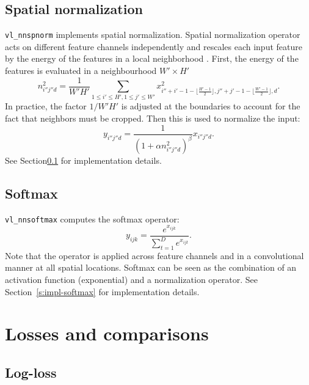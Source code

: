 \subsection{Spatial normalization}\label{s:spnorm}

\verb!vl_nnspnorm! implements spatial normalization. Spatial normalization operator acts on different feature channels independently and rescales each input feature by the energy of the features in a local neighborhood . First, the energy of the features is evaluated in a neighbourhood $W'\times H'$
\[
n_{i''j''d}^2 = \frac{1}{W'H'}
\sum_{1\leq i' \leq H', 1 \leq j' \leq W'} x^2_{
i''+i'-1-\lfloor \frac{H'-1}{2}\rfloor,
j''+j'-1-\lfloor \frac{W'-1}{2}\rfloor,
d}.
\]
In practice, the factor $1/W'H'$ is adjusted at the boundaries to account for the fact that neighbors must be cropped. Then this is used to normalize the input:
\[
y_{i''j''d} = \frac{1}{(1 + \alpha n_{i''j''d}^2)^\beta} x_{i''j''d}.
\]
See Section\ref{s:spnorm} for implementation details.

\subsection{Softmax}\label{s:softmax}

\verb!vl_nnsoftmax! computes the softmax operator:
\[
 y_{ijk} = \frac{e^{x_{ijk}}}{\sum_{t=1}^D e^{x_{ijt}}}.
\]
Note that the operator is applied across feature channels and in a convolutional manner at all spatial locations. Softmax can be seen as the combination of an activation function (exponential) and a normalization operator. See Section~\ref{s:impl-softmax} for implementation details.

\section{Losses and comparisons}\label{s:losses}

\subsection{Log-loss}\label{s:loss}

